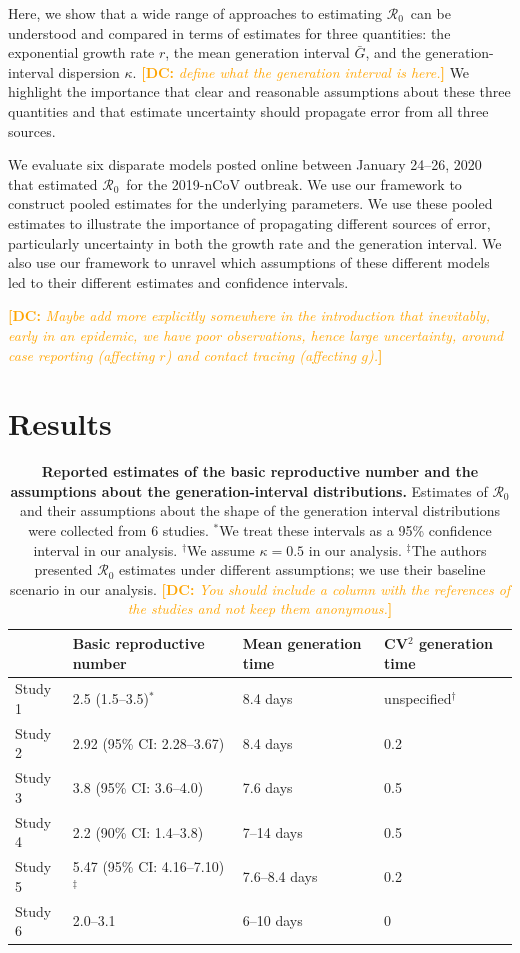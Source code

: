 \documentclass[12pt]{article}
\newcommand{\Rx}[1]{\ensuremath{{\mathcal R}_{#1}}}
\newcommand{\Ro}{\Rx{0}}
\newcommand{\comment}[3]{\textcolor{#1}{\textbf{[#2: }\textsl{#3}\textbf{]}}}
\newcommand{\dc}[1]{\comment{Orange}{DC}{#1}}
\begin{document}
Here, we show that a wide range of approaches to estimating \Ro\ can be understood and compared in terms of estimates for three quantities: the exponential growth rate $r$, the mean generation interval $\bar G$, and the generation-interval dispersion $\kappa$.  \dc{define what the generation interval is here.}
We highlight the importance that clear and reasonable assumptions about these three quantities and that estimate uncertainty should propagate error from all three sources. 

We evaluate six disparate models posted online between January 24--26, 2020 that estimated \Ro\ for the 2019-nCoV outbreak. We use our framework to construct pooled estimates for the underlying parameters. We use these pooled estimates to illustrate the importance of propagating different sources of error, particularly uncertainty in both the growth rate and the generation interval. We also use our framework to unravel which assumptions of these different models led to their different estimates and confidence intervals.

\dc{Maybe add more explicitly somewhere in the introduction that inevitably, early in an epidemic, we have poor observations, hence large uncertainty, around case reporting (affecting $r$) and contact tracing (affecting $g$).}

\section{Results}

\begin{table}[t]
\begin{center}
\footnotesize
\begin{tabular}{l|l|l|l}
 & Basic reproductive number & Mean generation time & CV$^2$ generation time \\
\hline
Study 1 & 2.5 (1.5--3.5)$^\ast$ & 8.4 days & unspecified$^\dagger$ \\
\hline
Study 2 & 2.92 (95\% CI: 2.28--3.67) & 8.4 days & 0.2 \\
\hline
Study 3 & 3.8 (95\% CI: 3.6--4.0) & 7.6 days & 0.5 \\
\hline
Study 4 & 2.2 (90\% CI: 1.4--3.8) & 7--14 days & 0.5\\
\hline
Study 5 & 5.47 (95\% CI: 4.16--7.10)$^\ddagger$ & 7.6--8.4 days & 0.2\\
\hline
Study 6 & 2.0--3.1 & 6--10 days & 0 \\
\hline
\end{tabular}
\end{center}
\caption{
\textbf{Reported estimates of the basic reproductive number and the assumptions about the generation-interval distributions.}
Estimates of $\mathcal R_0$ and their assumptions about the shape of the generation interval distributions were collected from 6 studies.
$^\ast$We treat these intervals as a 95\% confidence interval in our analysis.
$^\dagger$We assume $\kappa = 0.5$ in our analysis.
$^\ddagger$The authors presented $\mathcal R_0$ estimates under different assumptions; we use their baseline scenario in our analysis.
\dc{You should include a column with the references of the studies and not keep them anonymous.}
}
\end{table}
\end{document}
